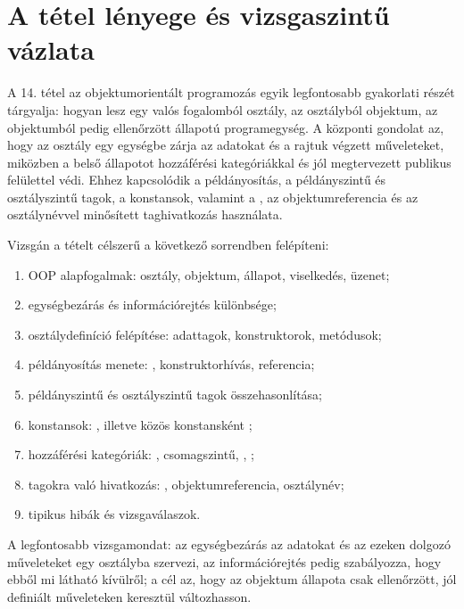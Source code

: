 \section{A tétel lényege és vizsgaszintű vázlata}

\begin{summarybox}
A 14. tétel az objektumorientált programozás egyik legfontosabb gyakorlati részét tárgyalja: hogyan lesz egy valós fogalomból osztály, az osztályból objektum, az objektumból pedig ellenőrzött állapotú programegység. A központi gondolat az, hogy az osztály egy egységbe zárja az adatokat és a rajtuk végzett műveleteket, miközben a belső állapotot hozzáférési kategóriákkal és jól megtervezett publikus felülettel védi. Ehhez kapcsolódik a példányosítás, a példányszintű és osztályszintű tagok, a konstansok, valamint a , az objektumreferencia és az osztálynévvel minősített taghivatkozás használata.
\end{summarybox}

Vizsgán a tételt célszerű a következő sorrendben felépíteni:

\begin{enumerate}
  \item OOP alapfogalmak: osztály, objektum, állapot, viselkedés, üzenet;
  \item egységbezárás és információrejtés különbsége;
  \item osztálydefiníció felépítése: adattagok, konstruktorok, metódusok;
  \item példányosítás menete: , konstruktorhívás, referencia;
  \item példányszintű és osztályszintű tagok összehasonlítása;
  \item konstansok: , illetve közös konstansként ;
  \item hozzáférési kategóriák: , csomagszintű, , ;
  \item tagokra való hivatkozás: , objektumreferencia, osztálynév;
  \item tipikus hibák és vizsgaválaszok.
\end{enumerate}

A legfontosabb vizsgamondat: az egységbezárás az adatokat és az ezeken dolgozó műveleteket egy osztályba szervezi, az információrejtés pedig szabályozza, hogy ebből mi látható kívülről; a cél az, hogy az objektum állapota csak ellenőrzött, jól definiált műveleteken keresztül változhasson.

